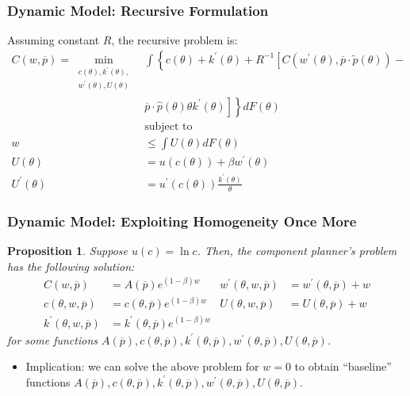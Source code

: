 \documentclass{beamer}
\newtheorem{proposition}{Proposition}
\begin{document}
\begin{frame}
    \frametitle{Dynamic Model: Recursive Formulation}
    Assuming constant \( R \), the recursive problem is:
    \begin{align*}
        C(w,\overline{p})=\min_{\substack{c(\theta),k^{\prime}(\theta),\\
        w^{\prime}(\theta),U(\theta)
        }
        } & \int\left\{ c\left(\theta\right)+k^{\prime}\left(\theta\right)+R^{-1}\left[C\left(w^{\prime}\left(\theta\right),\overline{p}\cdot\tilde{p}\left(\theta\right)\right)- \right.\right.\\
        &\left.\left.\overline{p}\cdot\hat{p}\left(\theta\right)\theta k^{\prime}\left(\theta\right)\right]\right\} dF\left(\theta\right)\\
        & \text{subject to} \\
        w & \le  \int U(\theta)dF(\theta)\\
        U(\theta) & =u\left(c(\theta)\right)+\beta w^{\prime}(\theta)\\
        U^{\prime}(\theta) & =u^{\prime}\left(c(\theta)\right)\frac{k^{\prime}(\theta)}{\theta}
    \end{align*}
    
\end{frame}

\begin{frame}
    \frametitle{Dynamic Model: Exploiting Homogeneity Once More}

    \begin{proposition}
        \label{prop:vf_homog}Suppose $u(c)=\ln c$. Then, the component planner's problem has the following solution: 
        \begin{align*}
        C\left(w,\overline{p}\right) & =A\left(\overline{p}\right)e^{\left(1-\beta\right)w} & w^{\prime}\left(\theta,w,\overline{p}\right) & =w^{\prime}\left(\theta,\overline{p}\right) + w \\
        c\left(\theta,w,\overline{p}\right) & =c\left(\theta,\overline{p}\right)e^{\left(1-\beta\right)w} & U\left(\theta,w,\overline{p}\right) & =U\left(\theta,\overline{p}\right)+w\\
        k^{\prime}\left(\theta,w,\overline{p}\right) & =k^{\prime}\left(\theta,\overline{p}\right)e^{\left(1-\beta\right)w}
        \end{align*}
        for some functions $A\left(\overline{p}\right),c(\theta,\overline{p}),k^{\prime}(\theta,\overline{p}),w^{\prime}(\theta,\overline{p}),U(\theta,\overline{p})$. 
    \end{proposition}
    
    \begin{itemize}
        \item Implication: we can solve the above problem for \( w=0 \) to obtain ``baseline'' functions $A\left(\overline{p}\right),c(\theta,\overline{p}),k^{\prime}(\theta,\overline{p}),w^{\prime}(\theta,\overline{p}),U(\theta,\overline{p})$. 
    \end{itemize}

\end{frame}
\end{document}
